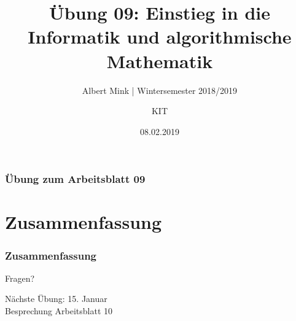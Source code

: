 \documentclass[c,18pt]{beamer}
\date{08.02.2019}
\title[Übung 09: Einstieg in die Informatik und algorithmische Mathematik]
  {Übung 09: Einstieg in die Informatik und algorithmische Mathematik}
\subtitle{Albert Mink | Wintersemester 2018/2019}
\author[Albert Mink, ]{KIT}
\institute[Institut für Angewandte und Numerische Mathematik (IANM)]{Institut für Angewandte und Numerische Mathematik}
\begin{document}
\begin{frame}
  \maketitle
\end{frame}

\begin{frame}
  \frametitle{Übung zum Arbeitsblatt 09}%
\tableofcontents[hideallsubsections]
\end{frame}


\setcounter{exercise}{33}
\setcounter{exercise}{34}

\section{Zusammenfassung}
\begin{frame}
  \frametitle{Zusammenfassung}%
\tableofcontents[hideallsubsections]
\end{frame}

\begin{frame}
\centering
\Huge\textcolor{KITgreen}{Fragen?}
\vspace{2cm}

{\LARGE
N\"achste \"Ubung: 15. Januar\\
Besprechung Arbeitsblatt 10
}
\end{frame}


\end{document}
